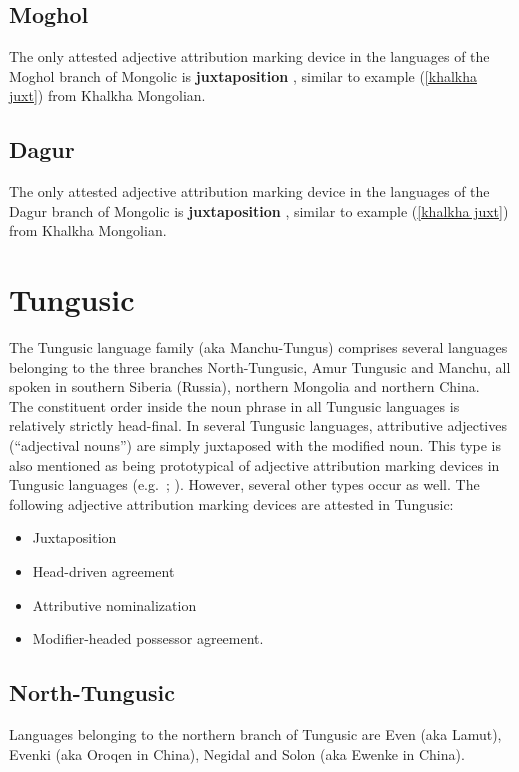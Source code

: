 \subsection{Moghol}
The only attested adjective attribution marking device in the languages of the Moghol branch of Mongolic is \textbf{juxtaposition} \citep{weiers2003}, similar to example (\ref{khalkha juxt}) from Khalkha Mongolian.

\subsection{Dagur}
The only attested adjective attribution marking device in the languages of the Dagur branch of Mongolic is \textbf{juxtaposition} \citep{tsumagari2003}, similar to example (\ref{khalkha juxt}) from Khalkha Mongolian.

\section{Tungusic} \label{tungusic synchr}
The Tungusic language family (aka Manchu-Tungus) comprises several languages belonging to the three branches North-Tungusic, Amur Tungusic and Manchu, all spoken in southern Siberia (Russia), northern Mongolia and northern China.\\

\noindent The constituent order inside the noun phrase in all Tungusic languages is relatively strictly head-final. In several Tungusic languages, attributive adjectives (“adjectival nouns”) are simply juxtaposed with the modified noun. This type is also mentioned as being prototypical of adjective attribution marking devices in Tungusic languages (e.g.~\citealt{sunik1968a}; \citealt[133]{kormusin2005}). However, several other types occur as well. The following adjective attribution marking devices are attested in Tungusic:
\begin{itemize}
\item Juxtaposition
\item Head-driven agreement
\item Attributive nominalization
\item Modifier-headed possessor agreement.
\end{itemize}

\subsection{North-Tungusic}
Languages belonging to the northern branch of Tungusic are Even (aka Lamut), Evenki (aka Oroqen in China), Negidal and Solon (aka Ewenke in China).\\

